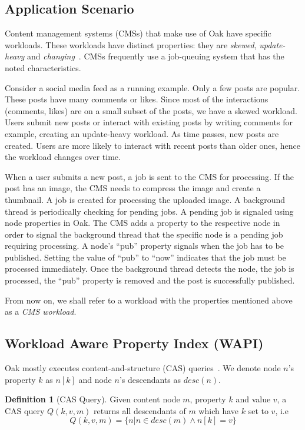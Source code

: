 \documentclass[abstracton,12pt]{scrartcl}
\theoremstyle{definition}
\newtheorem{definition}{Definition}
\begin{document}
\subsection{Application Scenario}
\label{sec:application_scenario}

Content management systems (CMSs) that make use of Oak have specific workloads.
These workloads have distinct properties: they are \textit{skewed},
\textit{update-heavy} and \textit{changing}~\cite{KW17}. CMSs frequently use a
job-queuing system that has the noted characteristics.

Consider a social media feed as a running example. Only a few posts are popular.
These posts have many comments or likes. Since most of the interactions
(comments, likes) are on a small subset of the posts, we have a skewed workload.
Users submit
new posts or interact with existing posts by
writing comments for example, creating an update-heavy workload. As time
passes, new posts are created. Users are more likely to interact with recent
posts than older ones, hence the workload changes over time.

When a user submits a new post, a job is sent to the CMS for processing. If the
post has an image, the CMS needs to compress the image and
create a thumbnail. A job is created for processing the uploaded image. A
background thread is periodically checking for pending
jobs. A pending job is signaled using node properties in Oak.
The CMS adds a property to the respective node in
order to signal the background thread that the specific node is a pending job requiring
processing. A node's ``pub'' property signals when the job has to be published.
Setting the value of ``pub'' to ``now'' indicates that the job must be processed
immediately.
Once the background thread detects the node, the job is processed, the ``pub''
property is removed and the post is successfully published.

From now on, we shall refer to a workload with the properties mentioned above as
a \textit{CMS workload}.

\subsection{Workload Aware Property Index (WAPI)}
\label{sec:wapi}

Oak mostly executes content-and-structure (CAS) queries~\cite{CM15}.
We denote node $n$'s property $k$ as $n[k]$ and node $n$'s descendants as
$desc(n)$.

\begin{definition}[CAS Query]
  Given content node $m$, property $k$ and value $v$, a CAS query
  $Q(k,v,m)$ returns all descendants of $m$ which have $k$ set to $v$, i.e
  $$ Q(k,v,m) = \{ n | n \in desc(m) \land n[k] = v\} $$
  \label{def:cas-query}
\end{definition}
\end{document}
